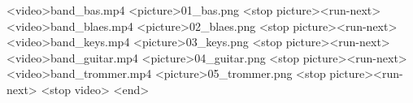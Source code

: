 <video>band_bas.mp4
<picture>01_bas.png
<stop picture><run-next>
<video>band_blaes.mp4
<picture>02_blaes.png
<stop picture><run-next>
<video>band_keys.mp4
<picture>03_keys.png
<stop picture><run-next>
<video>band_guitar.mp4
<picture>04_guitar.png
<stop picture><run-next>
<video>band_trommer.mp4
<picture>05_trommer.png
<stop picture><run-next>
<stop video>
<end>
